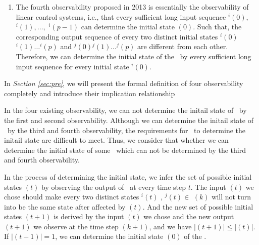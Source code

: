 \begin{enumerate}
	\item  The fourth observability proposed in 2013 \cite{Fornasini2013Observability} is essentially the observability of linear control systems, i.e., that every sufficient long input sequence \Input$^{i}(0),$ \Input$^{i}(1),\ldots,$ \Input$^{i}(p-1)$ can determine the initial state \State$(0)$. Such that, the corresponding output sequence of every two distinct initial states \Output$^{i}(0)$\Output$^{i}(1)\ldots$\Output$^{i}(p)$ and \Output$^{j}(0)$\Output$^{j}(1)\ldots$\Output$^{j}(p)$ are different from each other. Therefore, we can determine the initial state of the \BCN\ by every sufficient long input sequence for every initial state \State$^{i}(0)$.
\end{enumerate}
 


In {\em Section \ref{sec:pre}}, we will present the formal definition of four observability completely and introduce their implication relationship%

In the four existing observability, we can not determine the initail state of \BCNs\ by the first and second observability. Although we can determine the initail state of \BCNs\ by the third and fourth observability, the requirements for \BCNs\ to determine the initail state are difficult to meet. Thus, we consider that whether we can determine the initial state of some \BCNs\ which can not be determined by the third and fourth observability.

In the process of determining the initial state, we infer the set of possible initial states \Ustate$(t)$ by observing the output of \BCN\ at every time step $t$. The input \Input$(t)$ we chose should make every two distinct states \State$^{i}(t)$ , \State$^{j}(t)$$\in$ \Ustate$(k)$ will not turn into be the same state after affected by \Input$(t)$. And the new set of possible initial states \Ustate$(t+1)$ is derived by the input \Input$(t)$ we chose and the new output \Output$(t+1)$ we observe at the time step $(k+1)$, and we have $|$\Ustate$(t+1)$$|\le|$\Ustate$(t)$$|$. If $|$\Ustate$(t+1)$$|=1$, we can determine the initial state \State$(0)$ of the \BCN.

